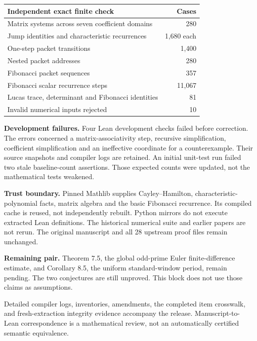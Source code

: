 \begin{center}
\begin{tabular}{@{}lr@{}}
\toprule
Independent exact finite check & Cases\\\midrule
Matrix systems across seven coefficient domains & 280\\
Jump identities and characteristic recurrences & 1,680 each\\
One-step packet transitions & 1,400\\
Nested packet addresses & 280\\
Fibonacci packet sequences & 357\\
Fibonacci scalar recurrence steps & 11,067\\
Lucas trace, determinant and Fibonacci identities & 81\\
Invalid numerical inputs rejected & 10\\\bottomrule
\end{tabular}
\end{center}
\textbf{Development failures.} Four Lean development checks failed before correction. The errors concerned a matrix-associativity step, recursive simplification, coefficient simplification and an ineffective coordinate for a counterexample. Their source snapshots and compiler logs are retained. An initial unit-test run failed two stale baseline-count assertions. Those expected counts were updated, not the mathematical tests weakened.

\textbf{Trust boundary.} Pinned Mathlib supplies Cayley--Hamilton, characteristic-polynomial facts, matrix algebra and the basic Fibonacci recurrence. Its compiled cache is reused, not independently rebuilt. Python mirrors do not execute extracted Lean definitions. The historical numerical suite and earlier papers are not rerun. The original manuscript and all 28 upstream proof files remain unchanged.

\textbf{Remaining pair.} Theorem 7.5, the global odd-prime Euler finite-difference estimate, and Corollary 8.5, the uniform standard-window period, remain pending. The two conjectures are still unproved. This block does not use those claims as assumptions.

Detailed compiler logs, inventories, amendments, the completed item crosswalk, and fresh-extraction integrity evidence accompany the release. Manuscript-to-Lean correspondence is a mathematical review, not an automatically certified semantic equivalence.

